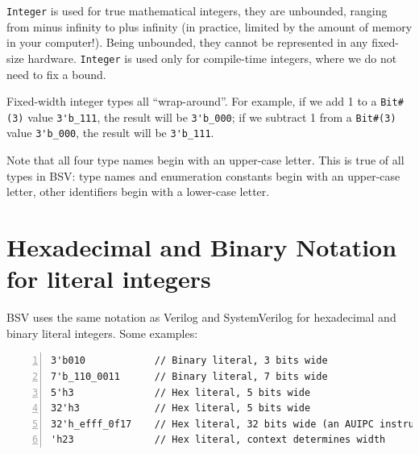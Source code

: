 \verb|Integer| is used for true mathematical integers, {\ie} they are
unbounded, ranging from minus infinity to plus infinity (in practice,
limited by the amount of memory in your computer!).  Being unbounded,
they cannot be represented in any fixed-size hardware.  \verb|Integer|
is used only for compile-time integers, where we do not need to fix a
bound.


Fixed-width integer types all ``wrap-around''.  For example, if we add
1 to a \verb|Bit#(3)| value \verb|3'b_111|, the result will be
\verb|3'b_000|; if we subtract 1 from a \verb|Bit#(3)| value
\verb|3'b_000|, the result will be \verb|3'b_111|.


Note that all four type names begin with an upper-case letter.  This
is true of all types in BSV: type names and enumeration constants
begin with an upper-case letter, other identifiers begin with a
lower-case letter.


\section{Hexadecimal and Binary Notation for literal integers}

\label{BSV_hex_bin_literals}


BSV uses the same notation as Verilog and SystemVerilog for
hexadecimal and binary literal integers.  Some examples:

{\small
\begin{Verbatim}[frame=single, numbers=left]
3'b010            // Binary literal, 3 bits wide
7'b_110_0011      // Binary literal, 7 bits wide
5'h3              // Hex literal, 5 bits wide
32'h3             // Hex literal, 5 bits wide
32'h_efff_0f17    // Hex literal, 32 bits wide (an AUIPC instruction)
'h23              // Hex literal, context determines width
\end{Verbatim}
}

